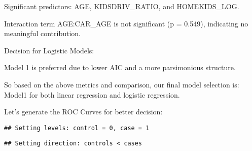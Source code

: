 \documentclass[
]{article}
\newenvironment{Shaded}{\begin{snugshade}}{\end{snugshade}}
\newcommand{\AttributeTok}[1]{\textcolor[rgb]{0.13,0.29,0.53}{#1}}
\newcommand{\CommentTok}[1]{\textcolor[rgb]{0.56,0.35,0.01}{\textit{#1}}}
\newcommand{\DecValTok}[1]{\textcolor[rgb]{0.00,0.00,0.81}{#1}}
\newcommand{\FloatTok}[1]{\textcolor[rgb]{0.00,0.00,0.81}{#1}}
\newcommand{\FunctionTok}[1]{\textcolor[rgb]{0.13,0.29,0.53}{\textbf{#1}}}
\newcommand{\NormalTok}[1]{#1}
\newcommand{\OtherTok}[1]{\textcolor[rgb]{0.56,0.35,0.01}{#1}}
\newcommand{\SpecialCharTok}[1]{\textcolor[rgb]{0.81,0.36,0.00}{\textbf{#1}}}
\newcommand{\StringTok}[1]{\textcolor[rgb]{0.31,0.60,0.02}{#1}}
\begin{document}
Significant predictors: AGE, KIDSDRIV\_RATIO, and HOMEKIDS\_LOG.

Interaction term AGE:CAR\_AGE is not significant (p = 0.549), indicating
no meaningful contribution.

Decision for Logistic Models:

Model 1 is preferred due to lower AIC and a more parsimonious structure.

So based on the above metrics and comparison, our final model selection
is: Model1 for both linear regression and logistic regression.

Let's generate the ROC Curves for better decision:

\begin{Shaded}
\end{Shaded}

\begin{verbatim}
## Setting levels: control = 0, case = 1
\end{verbatim}

\begin{verbatim}
## Setting direction: controls < cases
\end{verbatim}
\end{document}
